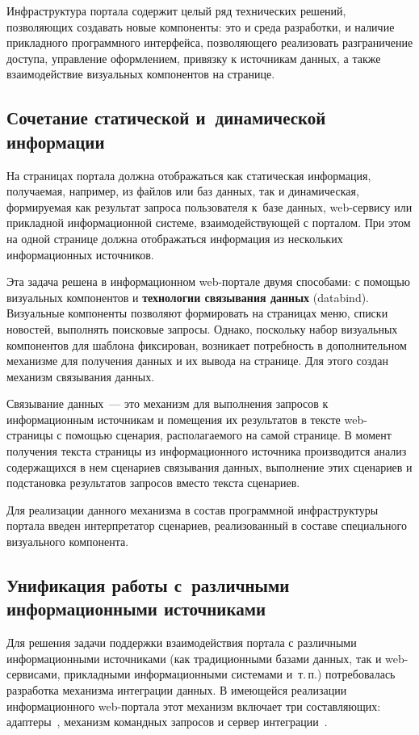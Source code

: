 \begin{multicols}{2}
 Инфраструктура портала содержит целый ряд технических решений, позволяющих
создавать новые компоненты: это и среда разработки, и наличие прикладного
программного интерфейса, позволяющего реализовать разграничение доступа,
управ\-ле\-ние оформлением, привязку к источникам %
\mbox{данных,} а также
взаимодействие визуальных компонентов на странице.

\subsection{Сочетание статической и~динамической информации} %

 На страницах портала должна отображаться как статическая информация,
получаемая, например, из файлов или баз данных, так и динамическая, формируемая как
результат запроса пользователя к~базе данных, web-сервису или прикладной
ин\-формационной системе, взаимодействующей с порталом. При этом на одной странице
должна отображаться информация из нескольких информационных источников.

 Эта задача решена в информационном web-портале двумя способами: с помощью
визуальных компонентов и \textbf{технологии связывания данных} (databind).
Визуальные компоненты позволяют формировать на страницах меню, списки
новостей, выполнять поисковые запросы. Однако, поскольку набор визуальных
компонентов для шаблона фиксирован, возникает потребность в дополнительном
механизме для получения данных и их вывода на странице. Для этого создан
механизм связывания данных.

 Связывание данных~--- это механизм для выполнения запросов к информационным
источникам и помещения их результатов в тексте web-страницы с помощью сценария,
располагаемого на самой странице. В момент получения текста страницы из
информационного источника производится анализ содержащихся в нем сценариев
связывания данных, выполнение этих сценариев и подстановка результатов запросов
вместо текста сценариев.

 Для реализации данного механизма в состав программной инфраструктуры портала
введен интерпретатор сценариев, реализованный в составе специального визуального
компонента.

\subsection{Унификация работы с~различными информационными
источниками} %

 Для решения задачи поддержки взаимодействия портала с различными
информационными источниками (как традиционными базами данных, так и
 web-сер\-ви\-са\-ми, прикладными информационными системами и~т.\,п.)
потребовалась разработка механизма интеграции данных. В имеющейся реализации
информационного web-портала этот механизм включает три составляющих:
адаптеры~\cite{6bos}, механизм командных запросов и сервер ин\-те\-гра\-ции~\cite{7bos}.
{

}
\end{multicols}
